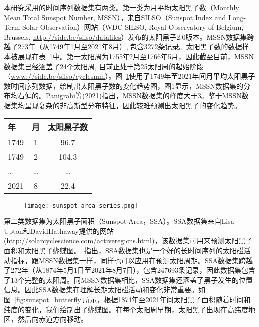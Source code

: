 本研究采用的时间序列数据集有两类。第一类为月平均太阳黑子数（Monthly Mean Total Sunspot Number, MSSN），来自SILSO（Sunspot Index and Long-Term Solar Observation）网站（WDC-SILSO, Royal Observatory of Belgium, Brussels, \href{http://sidc.be/silso/datafiles}{http://sidc.be/silso/datafiles}）发布的太阳黑子2.0版本。MSSN数据集跨越了273年（从1749年1月至2021年8月）, 包含3272条记录。太阳黑子数的数据样本被展现在表~\ref{tab:sunspot_number}中。第一太阳周为1755年2月至1766年5月，因此截至目前，MSSN数据集已经涵盖了24个太阳周, 目前正处于第25太阳周的起始阶段（\href{www://sidc.be/silso/cyclesmm}{www://sidc.be/silso/cyclesmm}）。图~\ref{fig:sunspot_area_series}使用了1749年至2021年间月平均太阳黑子数时间序列数据，绘制出太阳黑子数的变化趋势图，图1显示，MSSN数据集的分布均右偏的。Panigrahi等(2021)指出，MSSN数据集的峰度大于3。鉴于MSSN数据集均呈现复杂的非高斯型分布特征，因此较难预测出太阳黑子的变化趋势。

\begin{table}[!htbp]
    \label{tab:sunspot_number}
    \centering
    \footnotesize%
    \setlength{\tabcolsep}{4pt}
    \renewcommand{\arraystretch}{1.2}%
    \begin{tabular}{lcc}
        \hline
        年 & 月 & 太阳黑子数\\
        \hline
        1749 & 1 & 96.7 \\
        1749 & 2 & 104.3 \\
        \ldots & \ldots & \ldots \\
        2021 & 8 & 22.4 \\
        \hline
    \end{tabular}
\end{table}

\begin{figure}[!htbp]
    \centering
    \texttt{[image: sunspot\_area\_series.png]}
    \label{fig:sunspot_area_series}
\end{figure}

第二类数据集为太阳黑子面积（Sunspot Area，SSA）。SSA数据集来自Lisa Upton和DavidHathaway提供的网站(\href{http://solarcyclescience.com/activeregions.html}{http://solarcyclescience.com/activeregions.html})，该数据集可用来预测太阳黑子面积和太阳黑子蝴蝶图。~\citet{hathaway2015solar}指出，SSA数据集也是一个好的长时间序列的太阳磁活动指标，跟MSSN数据集一样，同样也可以应用在预测太阳周期。SSA数据集跨越了272年（从1874年5月1日至2021年8月7日），包含247693条记录，因此数据集包含了13个完整的太阳周。同MSSN数据集相比，SSA数据集还涵盖了黑子发生的位置信息。因此SSA数据集在理解长期太阳磁活动和变化非常重要。如图~\ref{fig:sunspot_butterfly}所示，根据1874年至2021年间太阳黑子面积随着时间和纬度的变化，我们绘制出了蝴蝶图。在每个太阳周早期，太阳黑子出现在高纬度地区，然后向赤道方向移动。

